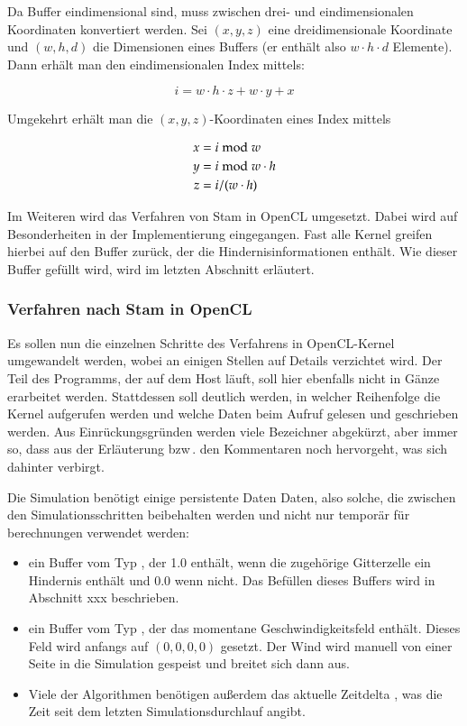 Da Buffer eindimensional sind, muss zwischen drei- und eindimensionalen
Koordinaten konvertiert werden. Sei $(x,y,z)$ eine dreidimensionale Koordinate
und $(w,h,d)$ die Dimensionen eines Buffers (er enthält also $w \cdot h \cdot d$
Elemente). Dann erhält man den eindimensionalen Index mittels:

\begin{equation}
i = w \cdot h \cdot z + w \cdot y + x
\end{equation}

Umgekehrt erhält man die $(x,y,z)$-Koordinaten eines Index mittels

\begin{align*}
x &= i \bmod w \\
y &= i \bmod w \cdot h \\
z &= i / (w \cdot h)  \\
\end{align*}

Im Weiteren wird das Verfahren von Stam in OpenCL umgesetzt. Dabei wird auf
Besonderheiten in der Implementierung eingegangen. Fast alle Kernel greifen
hierbei auf den Buffer zurück, der die Hindernisinformationen enthält. Wie
dieser Buffer gefüllt wird, wird im letzten Abschnitt erläutert.

\subsubsection{Verfahren nach Stam in OpenCL}

Es sollen nun die einzelnen Schritte des Verfahrens in OpenCL-Kernel umgewandelt
werden, wobei an einigen Stellen auf Details verzichtet wird. Der Teil des
Programms, der auf dem Host läuft, soll hier ebenfalls nicht in Gänze erarbeitet
werden. Stattdessen soll deutlich werden, in welcher Reihenfolge die Kernel
aufgerufen werden und welche Daten beim Aufruf gelesen und geschrieben werden.
Aus Einrückungsgründen werden viele Bezeichner abgekürzt, aber immer so, dass aus
der Erläuterung bzw\,. den Kommentaren noch hervorgeht, was sich dahinter
verbirgt.

Die Simulation benötigt einige persistente Daten Daten, also solche, die
zwischen den Simulationsschritten beibehalten werden und nicht nur temporär für
berechnungen verwendet werden:

\begin{itemize}
\item ein Buffer  vom Typ
, der 1.0 enthält, wenn die zugehörige Gitterzelle ein
Hindernis enthält und 0.0 wenn nicht. Das Befüllen dieses Buffers wird in
Abschnitt xxx beschrieben.
\item ein Buffer  vom Typ
, der das momentane Geschwindigkeitsfeld enthält.
Dieses Feld wird anfangs auf $(0,0,0,0)$ gesetzt. Der Wind wird manuell von
einer Seite in die Simulation gespeist und breitet sich dann aus.
\item Viele der Algorithmen benötigen außerdem das aktuelle Zeitdelta
, was die Zeit seit dem letzten Simulationsdurchlauf
angibt.
\end{itemize}

